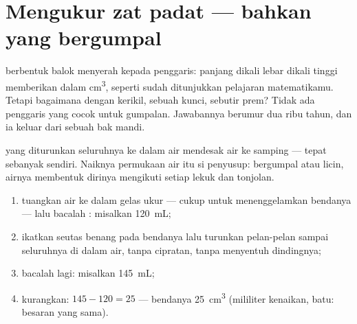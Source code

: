 \section{Mengukur zat padat --- bahkan yang bergumpal}

 berbentuk balok menyerah kepada penggaris: panjang dikali
lebar dikali tinggi memberikan  dalam \unit{cm^3}, seperti
sudah ditunjukkan pelajaran matematikamu. Tetapi bagaimana dengan
kerikil, sebuah kunci, sebutir prem? Tidak ada penggaris yang cocok
untuk gumpalan. Jawabannya berumur dua ribu tahun, dan ia keluar dari
sebuah bak mandi.

\begin{proposition}\label{prop:g6:mass-and-volume:displacement}
 yang diturunkan seluruhnya ke dalam air mendesak air ke
samping --- tepat sebanyak  sendiri. Naiknya permukaan air
itu  si penyusup: bergumpal atau licin, airnya membentuk
dirinya mengikuti setiap lekuk dan tonjolan.
\end{proposition}

\begin{method}\label{met:g6:mass-and-volume:rise}
\begin{enumerate}
  \item tuangkan air ke dalam gelas ukur --- cukup untuk
        menenggelamkan bendanya --- lalu bacalah : misalkan
        \qty{120}{mL};
  \item ikatkan seutas benang pada bendanya lalu turunkan pelan-pelan
        sampai seluruhnya di dalam air, tanpa cipratan, tanpa
        menyentuh dindingnya;
  \item bacalah lagi: misalkan \qty{145}{mL};
  \item kurangkan: $145 - 120 = 25$ ---  bendanya
        \qty{25}{cm^3} (mililiter kenaikan,  batu:
        besaran yang sama).
\end{enumerate}
\end{method}


